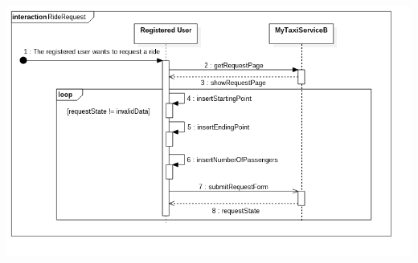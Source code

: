 \documentclass[11pt,titlepage]{article} %
\begin{document}
\begin{enumerate}
\begin{center}
		\includegraphics[scale=0.52]{usecase1.png}
		\end{center}
	

\end{enumerate}
\end{document}
